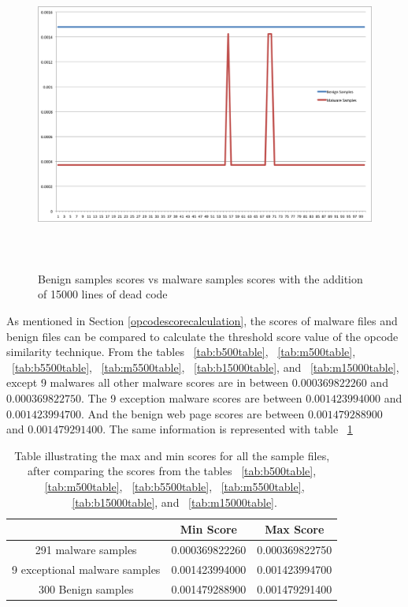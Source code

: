 \begin{figure}[h]
    \centering    
    \includegraphics[width=16cm, height=10.30cm]{15000.png}
    \caption[Benign Samples vs Malware Samples]{Benign samples scores vs malware samples scores with the addition of 15000 lines of dead code}
    \label{fig:bvsm15000}
\end{figure}

As mentioned in Section \ref{opcodescorecalculation}, the scores of malware files and benign files can be compared to calculate the threshold score value of the opcode similarity technique. From the tables ~\ref{tab:b500table}, ~\ref{tab:m500table}, ~\ref{tab:b5500table}, ~\ref{tab:m5500table}, ~\ref{tab:b15000table},  and ~\ref{tab:m15000table}, except 9 malwares all other malware scores are in between $0.000369822260$ and $0.000369822750$. The 9 exception malware scores are between $0.001423994000$ and $0.001423994700$. And the benign web page scores are between $0.001479288900$ and $0.001479291400$. The same information is represented with table ~\ref{tab:scoresummarytable}


\begin{table}[h]
\caption[Summary of max and min Scores]{Table illustrating the max and min scores for all the sample files, after comparing the scores from the tables ~\ref{tab:b500table}, ~\ref{tab:m500table}, ~\ref{tab:b5500table}, ~\ref{tab:m5500table}, ~\ref{tab:b15000table}, and ~\ref{tab:m15000table}. }
    \label{tab:scoresummarytable}
  \centering
  \begin{tabular}{|c|c|c|} 
  \midrule
 & Min Score& Max Score\\
\midrule
291 malware samples & 0.000369822260 & 0.000369822750\\ 
 \midrule 
9 exceptional malware samples & 0.001423994000 & 0.001423994700\\ 
 \midrule 
300 Benign samples &0.001479288900 & 0.001479291400 \\
 \midrule 
\end{tabular}
    
\end{table}

